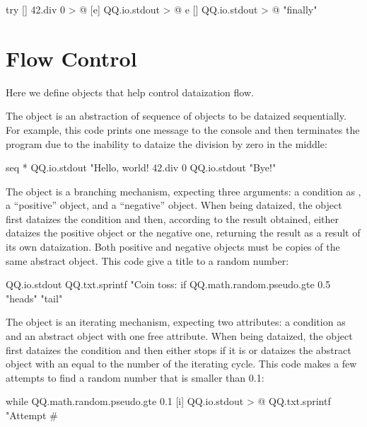 \documentclass[sigplan,11pt,nonacm]{acmart}
\newcommand\aff[1]{\ff{\textcolor{gray}{$\star$}#1}}
\newcommand\adeff[1]{\aff{\textcolor{blue!50!black}{\textbf{#1}}}}
\begin{document}
\begin{ffcode}
try
  []
    42.div 0 > @
  [e]
    QQ.io.stdout > @
      e
  []
    QQ.io.stdout > @
      "finally"
\end{ffcode}

\section{Flow Control}\label{sec:flow}

Here we define objects that help control dataization flow.

The \adeff{seq} object is an abstraction of sequence of objects to be dataized
sequentially. For example, this code prints one message to the console and then
terminates the program due to the inability to dataize the division by zero in
the middle:

\begin{ffcode}
seq
  *
    QQ.io.stdout "Hello, world!
    42.div 0
    QQ.io.stdout "Bye!"
\end{ffcode}

The \adeff{if} object is a branching mechanism, expecting three arguments: a
condition as , a ``positive'' object, and a ``negative'' object. When
being dataized, the object \aff{if} first dataizes the condition and then,
according to the result obtained, either dataizes the positive object or the
negative one, returning the result as a result of its own dataization. Both
positive and negative objects must be copies of the same abstract object. This
code give a title to a random number:

\begin{ffcode}
QQ.io.stdout
  QQ.txt.sprintf
    "Coin toss: %
    if
      QQ.math.random.pseudo.gte 0.5
      "heads"
      "tail"
\end{ffcode}

The \adeff{while} object is an iterating mechanism, expecting two attributes: a
condition as  and an abstract object with one free attribute. When
being dataized, the object \aff{while} first dataizes the condition and then
either stops if it is  or dataizes the abstract object with an
 equal to the number of the iterating cycle. This code makes a few
attempts to find a random number that is smaller than 0.1:

\begin{ffcode}
while
  QQ.math.random.pseudo.gte 0.1
  [i]
    QQ.io.stdout > @
      QQ.txt.sprintf
        "Attempt #%
\end{ffcode}
\end{document}
